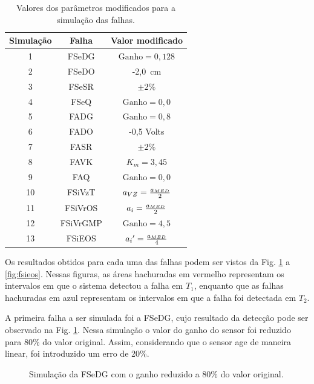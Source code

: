 \begin{table}[htb]
\centering
\caption{Valores dos parâmetros modificados para a simulação das falhas.}
\label{tab:valores_parametros}
\vspace{0.25cm}
\begin{tabular}{|c|c|c|}
\hline
{\bf Simulação} & {\bf Falha} & {\bf Valor modificado}\\
\hline
\hline
1 & FSeDG & $\text{Ganho} = 0,128$\\
\hline
2 & FSeDO & -2,0\ cm\\
\hline
3 & FSeSR & $\pm 2\%$\\
\hline
4 & FSeQ & $\text{Ganho} = 0,0$\\
\hline
\hline
5 & FADG & $\text{Ganho} = 0,8$\\
\hline
6 & FADO & -0,5 Volts\\
\hline
7 & FASR & $\pm 2\%$\\
\hline
8 & FAVK & $K_m = 3,45$\\ 
\hline
9 & FAQ & $\text{Ganho} = 0,0$\\
\hline
\hline
10 & FSiVzT & $a_{\tiny VZ} = \frac{a_{\tiny MED}}{2}$\\
\hline
11 & FSiVrOS & $a_i = \frac{a_{\tiny MED}}{2}$\\
\hline
12 & FSiVrGMP & $\text{Ganho} = 4,5$\\
\hline
13 & FSiEOS & ${a_i}' = \frac{a_{\tiny MED}}{4}$\\
\hline
\end{tabular}
\end{table}

Os resultados obtidos para cada uma das falhas podem ser vistos da Fig.
\ref{fig:fsedg} a \ref{fig:fsieos}. Nessas figuras, as áreas hachuradas em
vermelho representam os intervalos em que o sistema detectou a falha em $T_1$,
enquanto que as falhas hachuradas em azul representam os intervalos em que a
falha foi detectada em $T_2$.

A primeira falha a ser simulada foi a FSeDG, cujo resultado da detecção pode ser
observado na Fig. \ref{fig:fsedg}. Nessa simulação o valor do ganho do sensor
foi reduzido para 80\% do valor original. Assim, considerando que o sensor age
de maneira linear, foi introduzido um erro de 20\%.

\begin{figure}[htb]
\footnotesize
\centering

\vspace{1cm}
\caption{Simulação da FSeDG com o ganho reduzido a 80\% do valor original.}
\label{fig:fsedg}
\end{figure}

